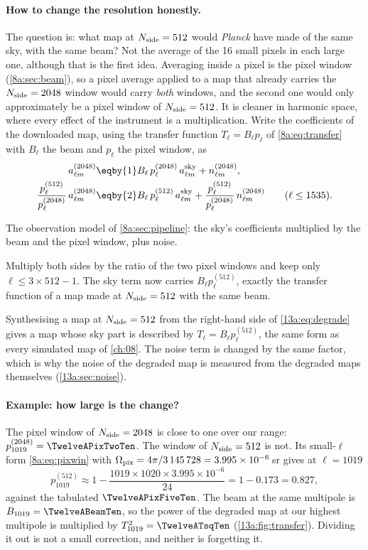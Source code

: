 \paragraph{How to change the resolution honestly.} The question is: what map at $N_{\rm side}=512$ would
\textit{Planck} have made of the same sky, with the same beam? Not the average of the 16 small pixels in
each large one, although that is the first idea. Averaging inside a pixel is the pixel window
(\cref{8a:sec:beam}), so a pixel average applied to a map that already carries the $N_{\rm side}=2048$
window would carry \emph{both} windows, and the second one would only approximately be a pixel window of
$N_{\rm side}=512$. It is cleaner in harmonic space, where every effect of the instrument is a
multiplication. Write the coefficients of the downloaded map, using the transfer function $T_\ell=B_\ell p_\ell$
of \eqref{8a:eq:transfer} with $B_\ell$ the beam and $p_\ell$ the pixel window, as
\begin{align}
  a^{(2048)}_{\ell m}
  &\eqby{1}B_\ell\,p^{(2048)}_\ell\,a^{\rm sky}_{\ell m}+n^{(2048)}_{\ell m},
  \nonumber\\
  \frac{p^{(512)}_\ell}{p^{(2048)}_\ell}\,a^{(2048)}_{\ell m}
  &\eqby{2}B_\ell\,p^{(512)}_\ell\,a^{\rm sky}_{\ell m}+\frac{p^{(512)}_\ell}{p^{(2048)}_\ell}\,n^{(2048)}_{\ell m}
   \qquad(\ell\le1535).
  \label{13a:eq:degrade}
\end{align}
\begin{explain}
  \item The observation model of \cref{8a:sec:pipeline}: the sky's coefficients multiplied by the beam
        and the pixel window, plus noise.
  \item Multiply both sides by the ratio of the two pixel windows and keep only $\ell\le3\times512-1$.
        The sky term now carries $B_\ell p_\ell^{(512)}$, exactly the transfer function of a map made at
        $N_{\rm side}=512$ with the same beam.
\end{explain}
Synthesising a map at $N_{\rm side}=512$ from the right-hand side of \eqref{13a:eq:degrade} gives a map whose
sky part is described by $T_\ell=B_\ell p_\ell^{(512)}$, the same form as every simulated map of
\cref{ch:08}. The noise term is changed by the same factor, which is why the noise of the degraded map
is measured from the degraded maps themselves (\cref{13a:sec:noise}).

\paragraph{Example: how large is the change?} The pixel window of $N_{\rm side}=2048$ is close to one over our
range: $p^{(2048)}_{1019}=\TwelveAPixTwoTen$. The window of $N_{\rm side}=512$ is not. Its small-$\ell$ form
\eqref{8a:eq:pixwin} with $\Omega_{\rm pix}=4\pi/3\,145\,728=3.995\times10^{-6}$\,sr gives at $\ell=1019$
\[
  p^{(512)}_{1019}\approx1-\frac{1019\times1020\times3.995\times10^{-6}}{24}=1-0.173=0.827,
\]
against the tabulated $\TwelveAPixFiveTen$. The beam at the same multipole is $B_{1019}=\TwelveABeamTen$, so the
power of the degraded map at our highest multipole is multiplied by $T^2_{1019}=\TwelveATsqTen$
(\cref{13a:fig:transfer}). Dividing it out is not a small correction, and neither is forgetting it.

